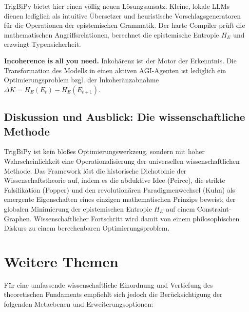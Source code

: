 \documentclass[11pt, a4paper]{article}
\begin{document}
	TrigBiPy bietet hier einen völlig neuen Lösungsansatz. Kleine, lokale LLMs dienen lediglich als intuitive Übersetzer und heuristische Vorschlagsgeneratoren für die Operationen der epistemischen Grammatik. Der harte Compiler prüft die mathematischen Angriffsrelationen, berechnet die epistemische Entropie $H_E$ und erzwingt Typensicherheit. 
	
	\textbf{Incoherence is all you need.} Inkohärenz ist der Motor der Erkenntnis. Die Transformation des Modells in einen aktiven AGI-Agenten ist lediglich ein Optimierungsproblem bzgl. der Inkoheränzabnahme $\Delta K = H_E(E_t) - H_E(E_{t+1})$.
	
	\subsection{Diskussion und Ausblick: Die wissenschaftliche Methode}
	
	TrigBiPy ist kein bloßes Optimierungswerkzeug, sondern mit hoher Wahrscheinlichkeit eine Operationalisierung der universellen wissenschaftlichen Methode. Das Framework löst die historische Dichotomie der Wissenschaftstheorie auf, indem es die abduktive Idee (Peirce), die strikte Falsifikation (Popper) und den revolutionären Paradigmenwechsel (Kuhn) als emergente Eigenschaften eines einzigen mathematischen Prinzips beweist: der globalen Minimierung der epistemischen Entropie $H_E$ auf einem Constraint-Graphen. Wissenschaftlicher Fortschritt wird damit von einem philosophischen Diskurs zu einem berechenbaren Optimierungsproblem.
	
\section{Weitere Themen}
Für eine umfassende wissenschaftliche Einordnung und Vertiefung des theoretischen Fundaments empfiehlt sich jedoch die Berücksichtigung der folgenden Metaebenen und Erweiterungsoptionen:
\end{document}
